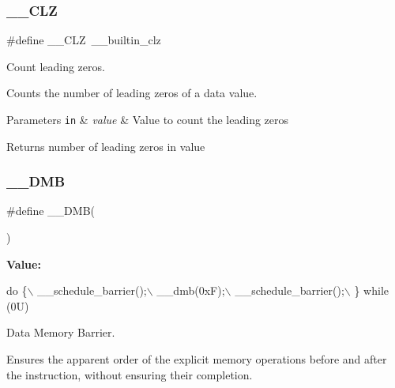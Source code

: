 \subsubsection{\texorpdfstring{\+\_\+\+\_\+\+C\+LZ}{\_\_CLZ}\hspace{0.1cm}{\footnotesize\ttfamily [3/3]}}
{\footnotesize\ttfamily \#define \+\_\+\+\_\+\+C\+LZ~\+\_\+\+\_\+builtin\+\_\+clz}



Count leading zeros. 

Counts the number of leading zeros of a data value. 
\begin{DoxyParams}[1]{Parameters}
\mbox{\tt in}  & {\em value} & Value to count the leading zeros \\
\hline
\end{DoxyParams}
\begin{DoxyReturn}{Returns}
number of leading zeros in value 
\end{DoxyReturn}
\mbox{\label{group___c_m_s_i_s___core___instruction_interface_ga671101179b5943990785f36f8c1e2269}} 
\subsubsection{\texorpdfstring{\+\_\+\+\_\+\+D\+MB}{\_\_DMB}\hspace{0.1cm}{\footnotesize\ttfamily [1/2]}}
{\footnotesize\ttfamily \#define \+\_\+\+\_\+\+D\+MB(\begin{DoxyParamCaption}{ }\end{DoxyParamCaption})}

{\bfseries Value\+:}
\begin{DoxyCode}
\textcolor{keywordflow}{do} \{\(\backslash\)
                   \_\_schedule\_barrier();\(\backslash\)
                   \_\_dmb(0xF);\(\backslash\)
                   \_\_schedule\_barrier();\(\backslash\)
                \} \textcolor{keywordflow}{while} (0U)
\end{DoxyCode}


Data Memory Barrier. 

Ensures the apparent order of the explicit memory operations before and after the instruction, without ensuring their completion. \mbox{\label{group___c_m_s_i_s___core___instruction_interface_ga671101179b5943990785f36f8c1e2269}} 

